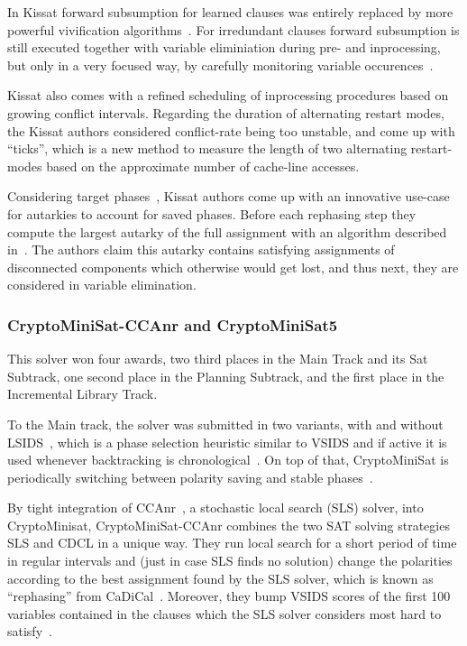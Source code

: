 \documentclass{elsarticle}
\begin{document}
In Kissat forward subsumption for learned clauses was entirely replaced by more powerful vivification algorithms~\cite{ChuMinLi:2020:Vivification}. 
For irredundant clauses forward subsumption is still executed together with variable eliminiation during pre- and inprocessing, but only in a very focused way, by carefully monitoring variable occurences~\cite{Biere:SC2020}.

Kissat also comes with a refined scheduling of inprocessing procedures based on growing conflict intervals. 
Regarding the duration of alternating restart modes, the Kissat authors considered conflict-rate being too unstable, and come up with ``ticks'', which is a new method to measure the length of two alternating restart-modes based on the approximate number of cache-line accesses. 

Considering target phases~\cite{Biere:SC2019}, Kissat authors come up with an innovative use-case for autarkies to account for saved phases. 
Before each rephasing step they compute the largest autarky of the full assignment with an algorithm described in~\cite{Kiesl:2019:Autarkies}. 
The authors claim this autarky contains satisfying assignments of disconnected components which otherwise would get lost, and thus next, they are considered in variable elimination. 


\subsubsection{CryptoMiniSat-CCAnr and CryptoMiniSat5}

This solver won four awards, two third places in the Main Track and its Sat Subtrack, one second place in the Planning Subtrack, and the first place in the Incremental Library Track. 

To the Main track, the solver was submitted in two variants, with and without LSIDS~\cite{Shaw:2020:LSIDS}, which is a phase selection heuristic similar to VSIDS and if active it is used whenever backtracking is chronological~\cite{Nadel:2018:CBT}. 
On top of that, CryptoMiniSat is periodically switching between polarity saving and stable phases~\cite{Biere:SC2019}.

By tight integration of CCAnr~\cite{Cai:2015:CCAnr}, a stochastic local search (SLS) solver, into CryptoMinisat, CryptoMiniSat-CCAnr combines the two SAT solving strategies SLS and CDCL in a unique way. 
They run local search for a short period of time in regular intervals and (just in case SLS finds no solution) change the polarities according to the best assignment found by the SLS solver, which is known as ``rephasing'' from CaDiCal~\cite{Biere:SC2019}.
Moreover, they bump VSIDS scores of the first 100 variables contained in the clauses which the SLS solver considers most hard to satisfy~\cite{Soos:SC2020}. 
\end{document}
